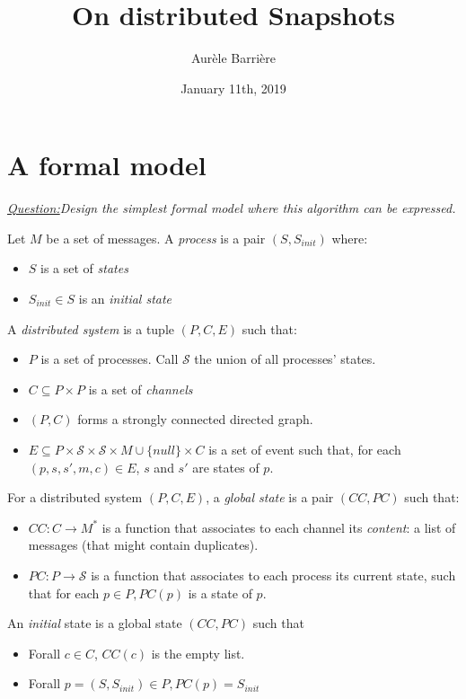 \documentclass{article}
\title{On distributed Snapshots}
\author{Aur\`ele Barri\`ere}
\date{January 11th, 2019}
\begin{document}
\maketitle

\def\q#1{\textit{\underline{Question:}#1}}

\section{A formal model}
\q{Design the simplest formal model where this algorithm can be expressed.}

Let $M$ be a set of messages. 
A \textit{process} is a pair $(S,S_{init})$ where:
\begin{itemize}
\item $S$ is a set of \textit{states}
\item $S_{init}\in S$ is an \textit{initial state}
\end{itemize}

A \textit{distributed system} is a tuple $(P,C,E)$ such that:
\begin{itemize}
\item $P$ is a set of processes. Call $\mathcal{S}$ the union of all processes' states.
\item $C\subseteq P\times P$ is a set of \textit{channels}
\item $(P,C)$ forms a strongly connected directed graph.
\item $E\subseteq P\times \mathcal{S}\times \mathcal{S}\times M\cup\{null\}\times C$ is a set of event such that, for each $(p,s,s',m,c)\in E$, $s$ and $s'$ are states of $p$.
\end{itemize}

For a distributed system $(P,C,E)$, a \textit{global state} is a pair $(CC,PC)$ such that:
\begin{itemize}
\item $CC: C\rightarrow M^*$ is a function that associates to each channel its \textit{content}: a list of messages (that might contain duplicates).
\item $PC: P \rightarrow \mathcal{S}$ is a function that associates to each process its current state, such that for each $p\in P, PC(p)$ is a state of $p$.
\end{itemize}

An \textit{initial} state is a global state $(CC,PC)$ such that
\begin{itemize}
\item Forall $c\in C$, $CC(c)$ is the empty list.
\item Forall $p=(S,S_{init})\in P, PC(p)=S_{init}$
\end{itemize}
\end{document}
